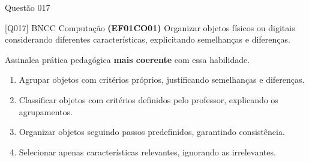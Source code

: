 \documentclass[xcolor=dvipsnames,table]{beamer}
\begin{document}
    \begin{frame}[shrink]{Questão 017}
	\begin{block}{[Q017] BNCC Computação}
		{\bf (EF01CO01)} Organizar objetos físicos ou digitais considerando diferentes características, explicitando semelhanças e diferenças.

		Assinalea prática pedagógica {\bf mais coerente} com essa habilidade.
	\end{block}
	\begin{enumerate}[label=(\Alph*)]
		\item Agrupar objetos com critérios próprios, justificando semelhanças e diferenças.
		\item Classificar objetos com critérios definidos pelo professor, explicando os agrupamentos.
		\item Organizar objetos seguindo passos predefinidos, garantindo consistência.
		\item Selecionar apenas características relevantes, ignorando as irrelevantes.
	
	\end{enumerate}
\end{frame}

	
	\begin{frame}
		\titlepage
	\end{frame}
	
\end{document}
